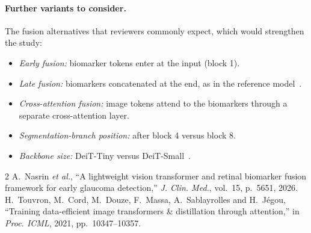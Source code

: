 \documentclass[10pt]{article}
\begin{document}
\paragraph{Further variants to consider.} The fusion alternatives that reviewers commonly expect, which would
strengthen the study:
\begin{itemize}
\item \emph{Early fusion:} biomarker tokens enter at the input (block 1).
\item \emph{Late fusion:} biomarkers concatenated at the end, as in the reference model~\cite{nasrin2026}.
\item \emph{Cross-attention fusion:} image tokens attend to the biomarkers through a separate cross-attention layer.
\item \emph{Segmentation-branch position:} after block 4 versus block 8.
\item \emph{Backbone size:} DeiT-Tiny versus DeiT-Small~\cite{touvron2021}.
\end{itemize}

\begin{thebibliography}{2}\footnotesize
{} A.~Nasrin \emph{et al.}, ``A lightweight vision transformer and retinal biomarker fusion
framework for early glaucoma detection,'' \emph{J. Clin. Med.}, vol.~15, p.~5651, 2026.
 H.~Touvron, M.~Cord, M.~Douze, F.~Massa, A.~Sablayrolles and H.~J\'egou,
``Training data-efficient image transformers \& distillation through attention,'' in \emph{Proc. ICML},
2021, pp.~10347--10357.
\end{thebibliography}
\end{document}
